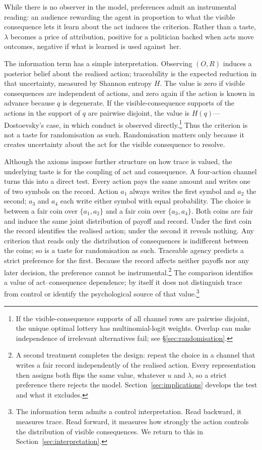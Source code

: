 \documentclass[11pt,a4paper]{article}
\theoremstyle{definition}
\newcommand{\Sh}{H}
\newcommand{\1}{\mathbf 1}
\begin{document}
While there is no observer in the model, preferences admit an instrumental reading: an audience rewarding the agent in proportion to what the visible consequence lets it learn about the act induces the criterion. Rather than a taste, $\lambda$ becomes a price of attribution, positive for a politician backed when acts move outcomes, negative if what is learned is used against~her.


The information term has a simple interpretation.  Observing $(O,R)$ induces a posterior belief about the realised
action; traceability is the expected reduction in that uncertainty, measured by Shannon entropy $\Sh$.  The value is
zero if visible consequences are independent of actions, and zero again if the action is known in advance
because $q$ is degenerate.  If the visible-consequence supports of the actions in the support of
$q$ are pairwise disjoint, the value is $\Sh(q)$---Dostoevsky's case, in which conduct is observed directly.\footnote{If the
visible-consequence supports of all channel rows are pairwise disjoint, the unique optimal lottery has
multinomial-logit weights.  Overlap can make independence of irrelevant alternatives fail; see
\S\ref{sec:randomisation}.}  Thus the criterion is
not a taste for randomisation as such.  Randomisation matters only because it creates uncertainty about the act for the
visible consequence to resolve.

Although the axioms impose further structure on how trace is valued,
the underlying taste is for the coupling of act and consequence.  A
four-action channel turns this into a direct test.  Every action pays the same amount and writes one of two
symbols on the record.  Action $a_1$ always writes the first symbol and $a_2$ the second; $a_3$ and $a_4$ each
write either symbol with equal probability.  The choice is between a fair coin over $\{a_1,a_2\}$ and a fair
coin over $\{a_3,a_4\}$.  Both coins are fair and induce the same joint distribution of payoff
and record.  Under the first coin the record identifies the realised action; under the second it reveals
nothing.  Any criterion that reads only the distribution of consequences is indifferent between the coins; so is
a taste for randomisation as such.  Traceable agency predicts a strict preference for the first.  Because the
record affects neither payoffs nor any later decision, the preference cannot be
instrumental.\footnote{A second treatment completes the design: repeat
the choice in a channel that writes a fair record independently of the realised action.  Every representation
then assigns both flips the same value, whatever $u$ and $\lambda$, so a strict preference there rejects the
model.  Section~\ref{sec:implications} develops the test and what it excludes.}  The comparison identifies a
value of act--consequence dependence; by itself it does not distinguish trace from control or identify the
psychological source of that value.\footnote{The information term admits a control interpretation. Read backward, it measures trace. Read forward, it measures how strongly the action controls the distribution of visible consequences. We return to this in Section~\ref{sec:interpretation}.}
\end{document}
